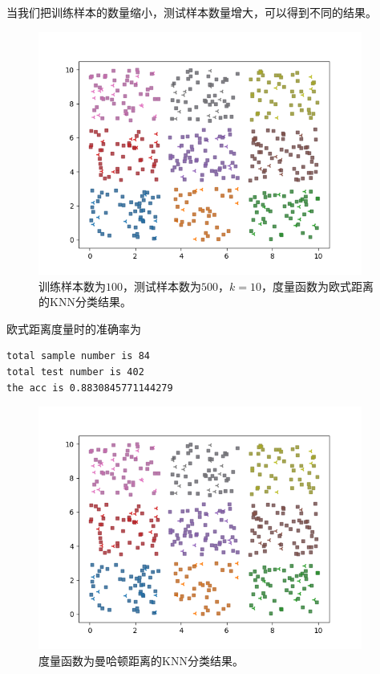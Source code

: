 \documentclass{article}
\begin{document}
当我们把训练样本的数量缩小，测试样本数量增大，可以得到不同的结果。
\begin{figure}[H]
    \centering
    \begin{minipage}[t]{1.0\linewidth}
        \centering
        \includegraphics[height=8cm]{eu2.png}
        \caption{训练样本数为$100$，测试样本数为$500$，$k=10$，度量函数为欧式距离的KNN分类结果。}
    \end{minipage}
 \end{figure}
 欧式距离度量时的准确率为
 \begin{verbatim}
total sample number is 84
total test number is 402
the acc is 0.8830845771144279
\end{verbatim}
 \begin{figure}[H]
    \centering
    \begin{minipage}[t]{1.0\linewidth}
        \centering
        \includegraphics[height=8cm]{man2.png}
        \caption{度量函数为曼哈顿距离的KNN分类结果。}
    \end{minipage}
 \end{figure}
\end{document}
